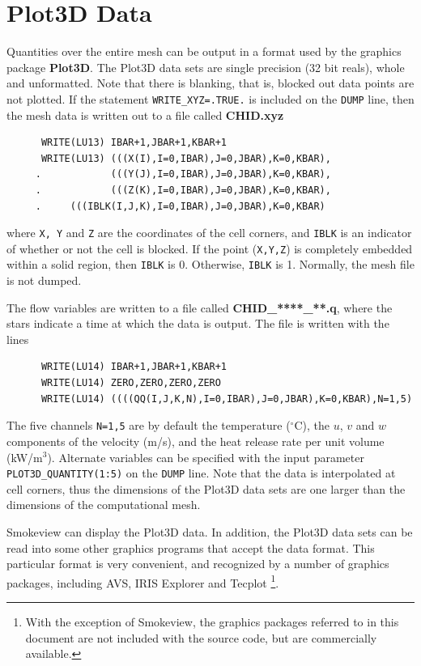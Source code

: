 \documentclass[11pt]{book}
\newcommand{\ct}{\tt\small}
\begin{document}
\section{Plot3D Data}
\label{out:PL3D}

Quantities over the entire mesh can be output in a format used by the graphics package {\bf Plot3D}.
The Plot3D data sets are single precision (32 bit reals), whole and
unformatted. Note that there is blanking, that is,
blocked out data points are not plotted.
If the statement {\ct WRITE\_XYZ=.TRUE.} is included on the {\ct DUMP}
line, then the mesh data is written out to a file called {\bf CHID.xyz}

\footnotesize
\begin{verbatim}
      WRITE(LU13) IBAR+1,JBAR+1,KBAR+1
      WRITE(LU13) (((X(I),I=0,IBAR),J=0,JBAR),K=0,KBAR),
     .            (((Y(J),I=0,IBAR),J=0,JBAR),K=0,KBAR),
     .            (((Z(K),I=0,IBAR),J=0,JBAR),K=0,KBAR),
     .     (((IBLK(I,J,K),I=0,IBAR),J=0,JBAR),K=0,KBAR)
\end{verbatim}
\normalsize
where {\ct X, Y} and {\ct Z} are the coordinates of the cell corners,
and {\ct IBLK} is an indicator of whether or not the cell is blocked.
If the point ({\ct X,Y,Z}) is completely embedded within a solid region,
then {\ct IBLK} is 0. Otherwise, {\ct IBLK} is 1. Normally, the mesh
file is not dumped.

The flow variables are written to a file called {\bf CHID\_****\_**.q},
where the stars indicate a time at which the data is output.
The file is written with the lines

\footnotesize
\begin{verbatim}
      WRITE(LU14) IBAR+1,JBAR+1,KBAR+1
      WRITE(LU14) ZERO,ZERO,ZERO,ZERO
      WRITE(LU14) ((((QQ(I,J,K,N),I=0,IBAR),J=0,JBAR),K=0,KBAR),N=1,5)
\end{verbatim}
\normalsize
The five channels {\ct N=1,5} are by default the temperature
($^\circ$C), the $u$, $v$ and
$w$ components of the velocity (m/s), and the heat release rate
per unit volume (kW/m$^3$). Alternate variables can be specified with
the input parameter {\ct PLOT3D\_QUANTITY(1:5)} on the {\ct DUMP} line.
Note that the data is interpolated at
cell corners, thus the dimensions of the Plot3D data sets are
one larger than the dimensions of the computational mesh.

Smokeview can display the Plot3D data. In
addition, the Plot3D data sets can be read into some other graphics
programs that accept the data format.
This particular format is very convenient, and recognized by
a number of graphics packages, including AVS, IRIS Explorer
and Tecplot
\footnote{With the exception of Smokeview,
the graphics packages referred to in this document are
not included with the source code, but are commercially available.}.
\end{document}
